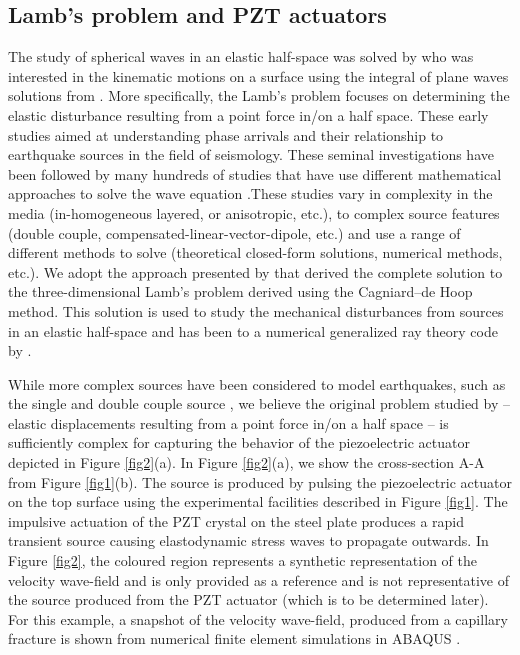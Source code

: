 \documentclass[preprint,3p, 11pt,authoryear]{elsarticle}
\begin{document}
\subsection{Lamb's problem and PZT actuators}

The study of spherical waves in an elastic half-space was solved by \citet{Lamb1904} who was interested in the kinematic motions on a surface using the integral of plane waves solutions from \citet{Rayleigh1988}. More specifically, the Lamb's problem focuses on determining the elastic disturbance resulting from a point force in/on a half space. These early studies aimed at understanding phase arrivals and their relationship to earthquake sources in the field of seismology. These seminal investigations have been followed by many hundreds of studies that have use different mathematical approaches to solve the wave equation \citep[e.g. ch 6 in][]{Aki2002}.These studies vary in complexity in the media (in-homogeneous layered, or anisotropic, etc.), to complex source features (double couple, compensated-linear-vector-dipole, etc.) and use a range of different methods to solve (theoretical closed-form solutions, numerical methods, etc.). We adopt the approach presented by \citet{Johnson1974} that derived the complete solution to the three-dimensional Lamb’s problem derived using the Cagniard--de Hoop method. This solution is used to study the mechanical disturbances from sources in an elastic half-space and has been to a numerical generalized ray theory code by \citet{Hsu1985} \citep[see also][]{McLaskey2011, McLaskey2012, Selvadurai2019}.

While more complex sources have been considered to model earthquakes, such as the single and double couple source \citet{Sato1972}, we believe the original problem studied by \citet{Lamb1904} -- elastic displacements resulting from a point force in/on a half space -- is sufficiently complex for capturing the behavior of the piezoelectric actuator depicted in Figure \ref{fig2}(a). In Figure \ref{fig2}(a), we show the cross-section A-A from Figure \ref{fig1}(b). The source is produced by pulsing the piezoelectric actuator on the top surface using the experimental facilities described in Figure \ref{fig1}. The impulsive actuation of the PZT crystal on the steel plate produces a rapid transient source causing elastodynamic stress waves to propagate outwards. In Figure \ref{fig2}, the coloured region represents a synthetic representation of the velocity wave-field and is only provided as a reference and is not representative of the source produced from the PZT actuator (which is to be determined later). For this example, a snapshot of the velocity wave-field, produced from a capillary fracture is shown from numerical finite element simulations in ABAQUS \citep[adapted from fig. 2][]{Selvadurai2019}. 
\end{document}
